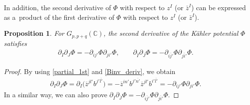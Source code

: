 \documentclass[pdftex]{sigma}
\numberwithin{equation}{section}
\newtheorem{Proposition}[Theorem]{Proposition}
 { \theoremstyle{definition}
\newtheorem{Definition}[Theorem]{Definition}
\newtheorem{Note}[Theorem]{Note}
\newtheorem{Example}[Theorem]{Example}
\newtheorem{Remark}[Theorem]{Remark} }
\begin{document}
In addition, the second derivative of $\Phi$ with respect to $z^{I}$ (or $\bar{z}^{I}$) can be expressed as a~product of the first derivative of $\Phi$ with respect to $z^{I}$ (or $\bar{z}^{I}$).
\begin{Proposition}\label{potential_deriv_grassmann_2nd}
For $ G_{p,p+q}(\mathbb{C})$, the second derivative of the K\"ahler potential $\Phi$ satisfies
\begin{align*}
 \partial_{I}
 \partial_{J}
 \Phi = -
 \partial_{ij'}
 \Phi
 \partial_{ji'}
 \Phi,
 \qquad
 \partial_{\overline{I}}
 \partial_{\overline{J}}
 \Phi = -
 \partial_{\overline{ij'}}
 \Phi
 \partial_{\overline{ji'}} \Phi.
\end{align*}
\end{Proposition}

\begin{proof}
By using \eqref{partial_1st} and \eqref{Binv_deriv}, we obtain
\begin{align*}
 \partial_{I}
 \partial_{J}
 \Phi
 =
 \partial_{I}
 \bigl(
 \overline{z}^{jl'}
 b^{j'\overline{l'}}
 \bigr)
 =
 -
 \overline{z}^{in'}
 b^{j'\overline{n'}}
 \overline{z}^{jl'}
 b^{i'\overline{l'}}
 =
 -
 \partial_{ij'}
 \Phi
 \partial_{ji'}
 \Phi.
\end{align*}
In a similar way, we can also prove
$ \partial_{\overline{I}} \partial_{\overline{J}} \Phi = - \partial_{\overline{ij'}} \Phi \partial_{\overline{ji'}} \Phi$.
\end{proof}
\end{document}
